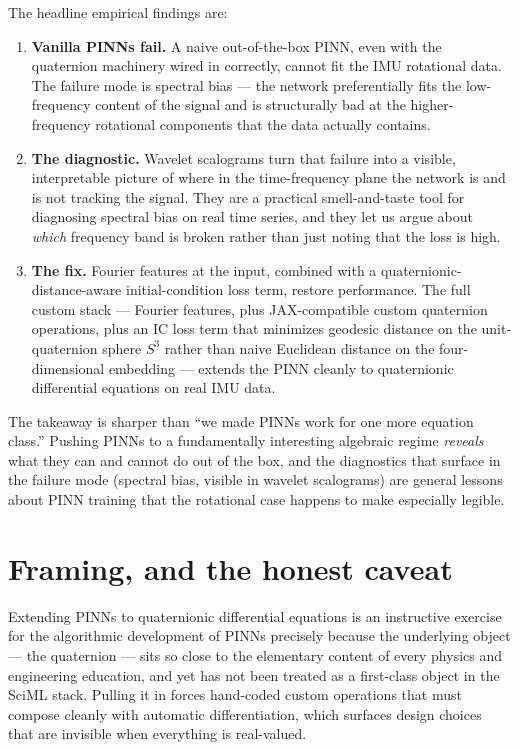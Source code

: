 \documentclass[11pt]{article}
\begin{document}
The headline empirical findings are:

\begin{enumerate}
\item \textbf{Vanilla PINNs fail.} A naive out-of-the-box PINN, even with the quaternion machinery wired in correctly, cannot fit the IMU rotational data. The failure mode is spectral bias --- the network preferentially fits the low-frequency content of the signal and is structurally bad at the higher-frequency rotational components that the data actually contains.
\item \textbf{The diagnostic.} Wavelet scalograms turn that failure into a visible, interpretable picture of where in the time-frequency plane the network is and is not tracking the signal. They are a practical smell-and-taste tool for diagnosing spectral bias on real time series, and they let us argue about \emph{which} frequency band is broken rather than just noting that the loss is high.
\item \textbf{The fix.} Fourier features at the input, combined with a quaternionic-distance-aware initial-condition loss term, restore performance. The full custom stack --- Fourier features, plus JAX-compatible custom quaternion operations, plus an IC loss term that minimizes geodesic distance on the unit-quaternion sphere $S^3$ rather than naive Euclidean distance on the four-dimensional embedding --- extends the PINN cleanly to quaternionic differential equations on real IMU data.
\end{enumerate}

The takeaway is sharper than ``we made PINNs work for one more equation class.'' Pushing PINNs to a fundamentally interesting algebraic regime \emph{reveals} what they can and cannot do out of the box, and the diagnostics that surface in the failure mode (spectral bias, visible in wavelet scalograms) are general lessons about PINN training that the rotational case happens to make especially legible.

\section{Framing, and the honest caveat}

Extending PINNs to quaternionic differential equations is an instructive exercise for the algorithmic development of PINNs precisely because the underlying object --- the quaternion --- sits so close to the elementary content of every physics and engineering education, and yet has not been treated as a first-class object in the SciML stack. Pulling it in forces hand-coded custom operations that must compose cleanly with automatic differentiation, which surfaces design choices that are invisible when everything is real-valued.
\end{document}
